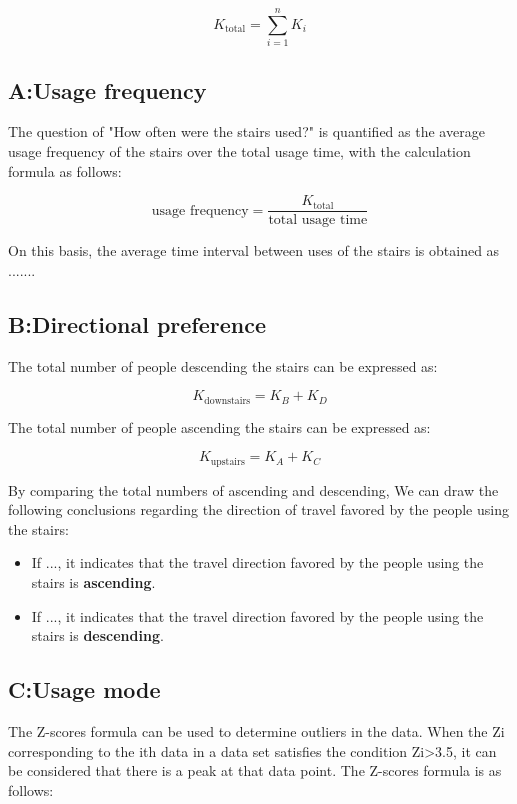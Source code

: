\documentclass{mcmthesis}
\begin{document}
\[ K_{\text{total}} = \sum_{i=1}^n K_i \]


\subsection{A:Usage frequency}

The question of "How often were the stairs used?" is quantified as the average usage frequency of the stairs over the total usage time, with the calculation formula as follows:

\[ \text{usage frequency} = \frac{K_{\text{total}}}{\text{total usage time}} \]

On this basis, the average time interval between uses of the stairs is obtained as .......

\subsection{B:Directional preference}

The total number of people descending the stairs can be expressed as:

\[ K_{\text{downstairs}} = K_B + K_D \]

The total number of people ascending the stairs can be expressed as:

\[ K_{\text{upstairs}} = K_A + K_C \]

By comparing the total numbers of ascending and descending, We can draw the following conclusions regarding the direction of travel favored by the people using the stairs:

\begin{itemize} 

\item If \(...\), it indicates that the travel direction favored by the people using the stairs is \textbf{ascending}. %

\item If \(...\), it indicates that the travel direction favored by the people using the stairs is \textbf{descending}. %

\end{itemize}


\subsection{C:Usage mode}
The Z-scores formula can be used to determine outliers in the data. When the Zi corresponding to the ith data in a data set satisfies the condition Zi>3.5\cite{curtis2016mystery}, it can be considered that there is a peak at that data point. The Z-scores formula is as follows:
\end{document}
